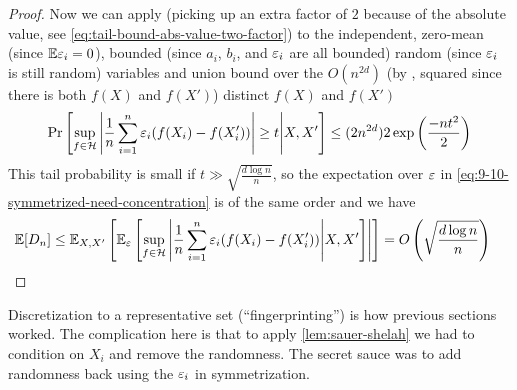 \begin{proof}
    Now we can apply  (picking up an extra factor of $2$ because
    of the absolute value, see \cref{eq:tail-bound-abs-value-two-factor}) to the independent,
    zero-mean (since $\mathbb{E} \varepsilon_i = 0$),
    bounded (since $a_i$, $b_i$, and $\varepsilon_i$ are all bounded)
    random (since $\varepsilon_i$ is still random) variables
    and union bound over the $O(n^{2d})$ (by , squared since there is both $f(X)$ and $f(X')$) distinct $f(X)$ and $f(X')$
    \begin{align}
        \Pr\left[ \sup_{f \in \mathcal{H}}
            \left\lvert \frac{1}{n} \sum_{i=1}^n \varepsilon_i(f(X_i) - f(X_i')) \right\rvert \geq t
        \middle| X, X' \right]
        &\leq (2 n^{2d}) 2 \exp\left(\frac{-n t^2}{2} \right) \\
    \end{align}
    This tail probability is small if $t \gg \sqrt{\frac{d \log n}{n}}$, so 
    the expectation over $\varepsilon$ in \cref{eq:9-10-symmetrized-need-concentration} is of the same order
    and we have
    \begin{align}
        \mathbb{E}[D_n]
        &\leq \mathbb{E}_{X, X'}\left[
            \mathbb{E}_{\varepsilon}\left[
                \sup_{f \in \mathcal{H}} \left\lvert \frac{1}{n} \sum_{i=1}^n \varepsilon_i ( f(X_i) - f(X_i') )
                \middle| X, X'\right]
        \right\rvert\right]
        = O\left(
            \sqrt{\frac{d \log n}{n}}
        \right)
    \end{align}
\end{proof}

Discretization to a representative set (``fingerprinting'') is how previous sections worked.
The complication here is that to apply \cref{lem:sauer-shelah} we had to condition on $X_i$ and
remove the randomness. The secret sauce was to add randomness back using the $\varepsilon_i$ in
symmetrization.
